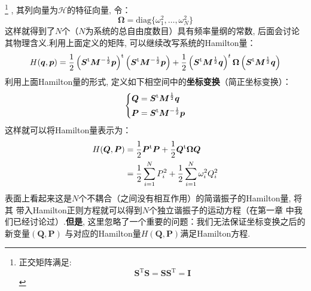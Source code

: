     \footnote{
        正交矩阵满足: 
    \begin{equation}
        \bm{S}^\mathrm{T}\bm{S} = \bm{SS}^\mathrm{T} = \bm{I}
    \end{equation}
    }
    , 其列向量为$\bm{\mathcal{H}}$的特征向量, 
    令：
    \begin{equation}
        \bm{\Omega} = \mathrm{diag} \{\omega_1^2, \dots, \omega_N^2 \}
    \end{equation}
    这样就得到了$N$个（$N$为系统的总自由度数目）具有频率量纲的常数, 后面会讨论
    其物理含义.利用上面定义的矩阵, 可以继续改写系统的Hamilton量：
    \begin{equation}
        H(\bm{q},\bm{p}) = \frac{1}{2}\left(\bm{S}^{\mathrm{t}}\bm{M}^{-\frac{1}{2}}\bm{p}\right)^{\mathrm{t}}\left(\bm{S}^{\mathrm{t}}\bm{M}^{-\frac{1}{2}}\bm{p}\right) + 
        \frac{1}{2}\left(\bm{S}^{\mathrm{t}}\bm{M}^{\frac{1}{2}}\bm{q}\right)^{t}\bm{\Omega}\left(\bm{S}^{\mathrm{t}}\bm{M}^{\frac{1}{2}}\bm{q}\right)
    \end{equation}
    利用上面Hamilton量的形式, 定义如下相空间中的\textbf{坐标变换}（简正坐标变换）：
    \begin{equation}
        \left\{
        \begin{split}
            \bm{Q} &= \bm{S}^{\mathrm{t}}\bm{M}^{\frac{1}{2}}\bm{q}\\
            \bm{P} &= \bm{S}^{\mathrm{t}}\bm{M}^{-\frac{1}{2}}\bm{p}
        \end{split}
        \right.
        \label{normal mode transformation}
    \end{equation}
    这样就可以将Hamilton量表示为：
    \begin{equation}
        \begin{split}
        H(\bm{Q},\bm{P}) &= \frac{1}{2}\bm{P}^{\mathrm{t}}\bm{P} + \frac{1}{2}\bm{Q}^{\mathrm{t}}\bm{\Omega}\bm{Q}\\
        & = \frac{1}{2}\sum_{i=1}^{N}P_{i}^2 + \frac{1}{2}\sum_{i=1}^{N}\omega_{i}^2Q_{i}^{2}
        \end{split}
    \end{equation}
    表面上看起来这是$N$个不耦合（之间没有相互作用）的简谐振子的Hamilton量, 将其
    带入Hamilton正则方程就可以得到$N$个独立谐振子的运动方程（在第一章
    中我们已经讨论过）.\textbf{但是}, 
    这里忽略了一个重要的问题：我们无法保证坐标变换之后的新变量$(\bm{Q},\bm{P})$
    与对应的Hamilton量$H(\bm{Q},\bm{P})$满足Hamilton方程.

    \splitline

